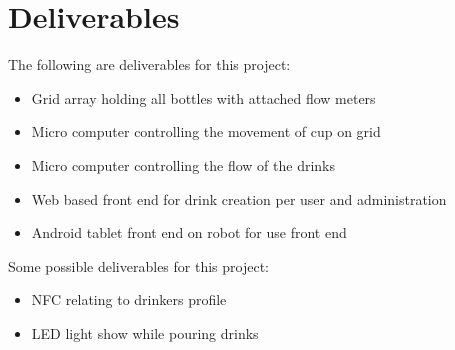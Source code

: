 
\section{Deliverables}

The following are deliverables for this project:
\begin{itemize}
    \item Grid array holding all bottles with attached flow meters
    \item Micro computer controlling the movement of cup on grid
    \item Micro computer controlling the flow of the drinks
    \item Web based front end for drink creation per user and 
          administration
    \item Android tablet front end on robot for use front end    \end{itemize}

Some possible deliverables for this project:
\begin{itemize}
    \item NFC relating to drinkers profile
    \item LED light show while pouring drinks
\end{itemize}    
